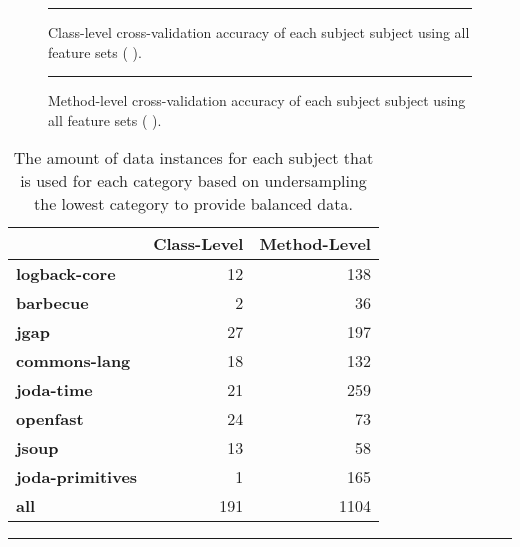\begin{figure}[!tb]
  \centering
  \begin{adjustbox}{max size={.95\textwidth}{.95\textheight}}
    
  \end{adjustbox}
  \caption{Class-level cross-validation accuracy of each subject subject using all feature sets (   ).}
  \vspace{1mm}
  \footnotesize{\emph{}}
  \vspace{2mm}
  \hrule
  \label{fig:individual_cross_validation_class_1_2_3_4_graph}
\end{figure}

\begin{figure}[!tb]
  \centering
  \begin{adjustbox}{max size={.95\textwidth}{.95\textheight}}
    
  \end{adjustbox}
  \caption{Method-level cross-validation accuracy of each subject subject using all feature sets (   ).}
  \vspace{1mm}
  \footnotesize{\emph{}}
  \vspace{2mm}
  \hrule
  \label{fig:individual_cross_validation_method_1_2_3_4_graph}
\end{figure}

\begin{table}[!tb]
  \centering
  \begin{threeparttable}
    \begin{tabular}{|l|r|r|}
      \rowcolor[RGB]{169,196,223}
      \hline & \textbf{Class-Level} & \textbf{Method-Level} \\
      \hline \cellcolor[RGB]{169,196,223} \textbf{logback-core} & 12 & 138 \\
      \hline \cellcolor[RGB]{169,196,223} \textbf{barbecue} & 2 & 36 \\
      \hline \cellcolor[RGB]{169,196,223} \textbf{jgap} & 27 & 197 \\
      \hline \cellcolor[RGB]{169,196,223} \textbf{commons-lang} & 18 & 132 \\
      \hline \cellcolor[RGB]{169,196,223} \textbf{joda-time} & 21 & 259 \\
      \hline \cellcolor[RGB]{169,196,223} \textbf{openfast} & 24 & 73 \\
      \hline \cellcolor[RGB]{169,196,223} \textbf{jsoup} & 13 & 58 \\
      \hline \cellcolor[RGB]{169,196,223} \textbf{joda-primitives} & 1 & 165 \\
      \hline \cellcolor[RGB]{169,196,223} \textbf{all} & 191 & 1104 \\
      \hline
    \end{tabular}
  \end{threeparttable}
  \caption{The amount of data instances for each subject that is used for each category based on undersampling the lowest category to provide balanced data.}
  \vspace{2mm}
  \hrule
  \label{tab:experiments_undersampled_data}
\end{table}

